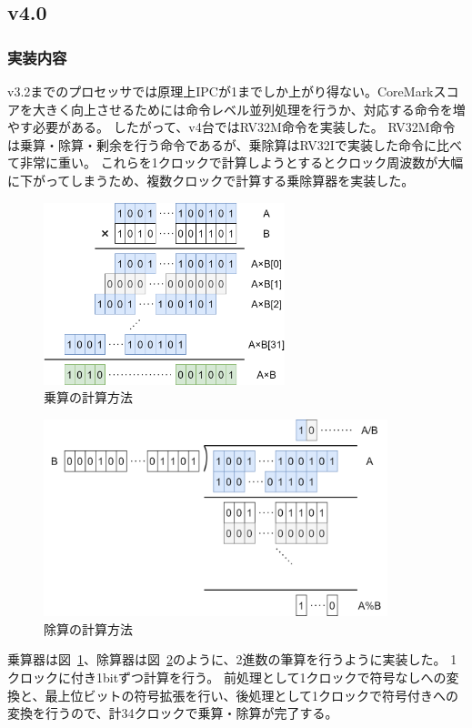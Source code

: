 \documentclass[dvipdfmx,10pt,a4paper,titlepage]{jsarticle}
\begin{document}
    \subsection{v4.0}
    \subsubsection{実装内容}
    v3.2までのプロセッサでは原理上IPCが1までしか上がり得ない。CoreMarkスコアを大きく向上させるためには命令レベル並列処理を行うか、対応する命令を増やす必要がある。
    したがって、v4台ではRV32M命令を実装した。
    RV32M命令は乗算・除算・剰余を行う命令であるが、乗除算はRV32Iで実装した命令に比べて非常に重い。
    これらを1クロックで計算しようとするとクロック周波数が大幅に下がってしまうため、複数クロックで計算する乗除算器を実装した。
    \begin{figure}
        \centering
        \includegraphics[width=7cm]{figure/mul.png}
        \caption{乗算の計算方法}\label{fig:multiplier}
    \end{figure}
    \begin{figure}
        \centering
        \includegraphics[width=10cm]{figure/divrem.png}
        \caption{除算の計算方法}\label{fig:divrem}
    \end{figure}
    乗算器は図~\ref{fig:multiplier}、除算器は図~\ref{fig:divrem}のように、2進数の筆算を行うように実装した。
    1クロックに付き1bitずつ計算を行う。
    前処理として1クロックで符号なしへの変換と、最上位ビットの符号拡張を行い、後処理として1クロックで符号付きへの変換を行うので、計34クロックで乗算・除算が完了する。
\end{document}
